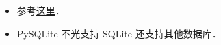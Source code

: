 
\begin{issues}
\issueDraft
\end{issues}


\begin{itemize}
\item 参考\href{https://www.sqlitetutorial.net/sqlite-python/}{这里}．
\item PySQLite 不光支持 SQLite 还支持其他数据库．
\end{itemize}
